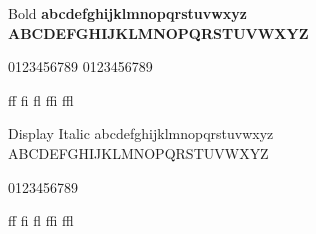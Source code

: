 \documentclass{scrartcl}
\begin{document}
\begin{style}{Bold}\bf
abcdefghijklmnopqrstuvwxyz \\
ABCDEFGHIJKLMNOPQRSTUVWXYZ

0123456789 \newline
{}
0123456789

ff fi fl ffi ffl
\end{style}


\begin{style}{Display Italic}\dispital
abcdefghijklmnopqrstuvwxyz \\
ABCDEFGHIJKLMNOPQRSTUVWXYZ

0123456789

ff fi fl ffi ffl
\end{style}
\end{document}
